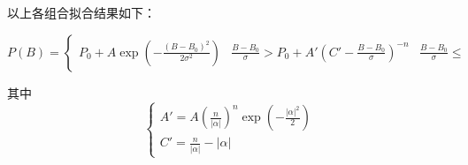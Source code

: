 \documentclass{thuemp}
\begin{document}
以上各组合拟合结果如下：

\begin{equation}
    P(B) =
    \begin{cases}
        P_0 + A \exp\left( -\frac{(B - B_0)^2}{2\sigma^2} \right) & \frac{B - B_0}{\sigma} >
        P_0 + A' \left( C' -\frac{B-B_0}{\sigma} \right)^{-n} & \frac{B - B_0}{\sigma} \leq
    \end{cases}
    \label{eq:crystalball}
\end{equation}

其中
\begin{equation}
    \begin{cases}
        A' = A \left( \frac n {|\alpha|}\right)^n \exp \left(-\frac{|\alpha|^2} 2\right) \\
    C' = \frac n {|\alpha|} - |\alpha|
    \end{cases}
\end{equation}
\end{document}
